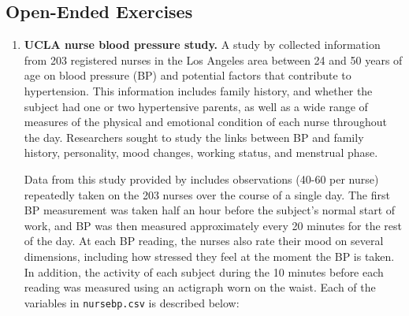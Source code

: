 \documentclass[
]{krantz}
\begin{document}
\hypertarget{open-ended-exercises-5}{%
\subsection{Open-Ended Exercises}\label{open-ended-exercises-5}}

\begin{enumerate}
\def\labelenumi{\arabic{enumi}.}
\item
  \textbf{UCLA nurse blood pressure study.} A study by \citet{Goldstein2000} collected information from 203 registered nurses in the Los Angeles area between 24 and 50 years of age on blood pressure (BP) and potential factors that contribute to hypertension. This information includes family history, and whether the subject had one or two hypertensive parents, as well as a wide range of measures of the physical and emotional condition of each nurse throughout the day. Researchers sought to study the links between BP and family history, personality, mood changes, working status, and menstrual phase.

  Data from this study provided by \citet{Weiss2005} includes observations (40-60 per nurse) repeatedly taken on the 203 nurses over the course of a single day. The first BP measurement was taken half an hour before the subject's normal start of work, and BP was then measured approximately every 20 minutes for the rest of the day. At each BP reading, the nurses also rate their mood on several dimensions, including how stressed they feel at the moment the BP is taken. In addition, the activity of each subject during the 10 minutes before each reading was measured using an actigraph worn on the waist. Each of the variables in \texttt{nursebp.csv} is described below:


\end{enumerate}
\end{document}
